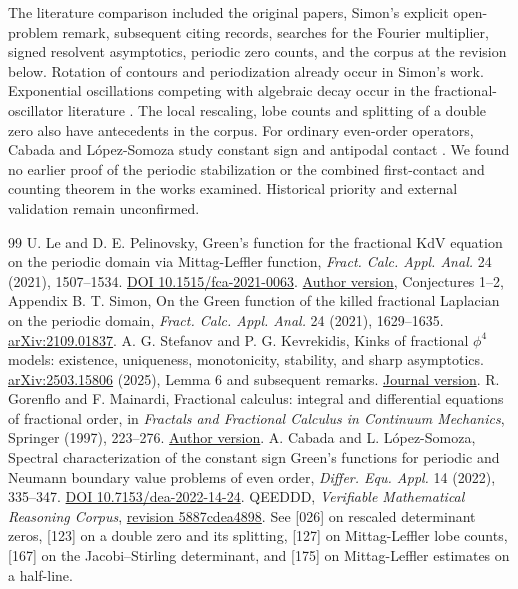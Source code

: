 \documentclass[11pt]{article}
\theoremstyle{plain}\newtheorem{theorem}{Theorem}[section]\newtheorem{lemma}[theorem]{Lemma}\newtheorem{corollary}[theorem]{Corollary}\newtheorem{proposition}[theorem]{Proposition}
\numberwithin{equation}{section}
\begin{document}
The literature comparison included the original papers, Simon's explicit open-problem remark, subsequent citing records, searches for the Fourier multiplier, signed resolvent asymptotics, periodic zero counts, and the corpus at the revision below. Rotation of contours and periodization already occur in Simon's work. Exponential oscillations competing with algebraic decay occur in the fractional-oscillator literature \cite{gm}. The local rescaling, lobe counts and splitting of a double zero also have antecedents in the corpus. For ordinary even-order operators, Cabada and López-Somoza study constant sign and antipodal contact \cite{cl}. We found no earlier proof of the periodic stabilization or the combined first-contact and counting theorem in the works examined. Historical priority and external validation remain unconfirmed.
\begin{thebibliography}{99}
 U. Le and D. E. Pelinovsky, Green's function for the fractional KdV equation on the periodic domain via Mittag-Leffler function, \emph{Fract. Calc. Appl. Anal.} 24 (2021), 1507--1534. \href{https://doi.org/10.1515/fca-2021-0063}{DOI 10.1515/fca-2021-0063}. \href{https://arxiv.org/pdf/2101.02269}{Author version}, Conjectures 1--2, Appendix B.
 T. Simon, On the Green function of the killed fractional Laplacian on the periodic domain, \emph{Fract. Calc. Appl. Anal.} 24 (2021), 1629--1635. \href{https://arxiv.org/abs/2109.01837}{arXiv:2109.01837}.
 A. G. Stefanov and P. G. Kevrekidis, Kinks of fractional $\phi^4$ models: existence, uniqueness, monotonicity, stability, and sharp asymptotics. \href{https://arxiv.org/abs/2503.15806}{arXiv:2503.15806} (2025), Lemma 6 and subsequent remarks. \href{https://doi.org/10.1088/1361-6544/ae669c}{Journal version}.
 R. Gorenflo and F. Mainardi, Fractional calculus: integral and differential equations of fractional order, in \emph{Fractals and Fractional Calculus in Continuum Mechanics}, Springer (1997), 223--276. \href{https://arxiv.org/abs/0805.3823}{Author version}.
 A. Cabada and L. López-Somoza, Spectral characterization of the constant sign Green's functions for periodic and Neumann boundary value problems of even order, \emph{Differ. Equ. Appl.} 14 (2022), 335--347. \href{https://doi.org/10.7153/dea-2022-14-24}{DOI 10.7153/dea-2022-14-24}.
 QEEDDD, \emph{Verifiable Mathematical Reasoning Corpus}, \href{https://github.com/QEEDDD/Verifiable-Mathematical-Reasoning-Corpus/tree/5887cdea4898f0a3aa5bf7a8e0829697bd2b0f4b}{revision 5887cdea4898}. See [026] on rescaled determinant zeros, [123] on a double zero and its splitting, [127] on Mittag-Leffler lobe counts, [167] on the Jacobi--Stirling determinant, and [175] on Mittag-Leffler estimates on a half-line.

\end{thebibliography}
\end{document}
